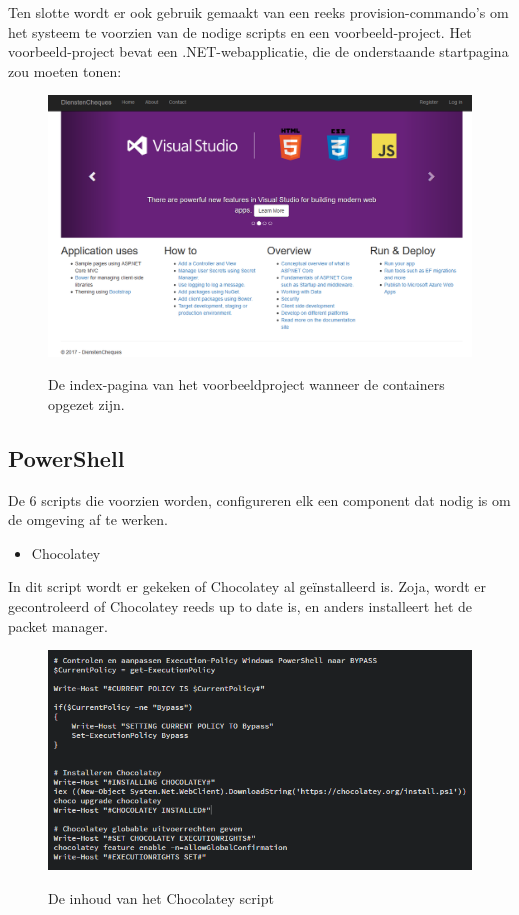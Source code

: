 Ten slotte wordt er ook gebruik gemaakt van een reeks provision-commando's om het systeem te voorzien van de nodige scripts en een voorbeeld-project. Het voorbeeld-project bevat een .NET-webapplicatie, die de onderstaande startpagina zou moeten tonen:

\begin{figure}
	\centering
	\caption{De index-pagina van het voorbeeldproject wanneer de containers opgezet zijn.}
	\includegraphics[scale=0.5]{img/applicatie}
	\label{webapplicatie}
\end{figure}

\subsection{PowerShell}
De 6 scripts die voorzien worden, configureren elk een component dat nodig is om de omgeving af te werken.

\begin{itemize}[noitemsep]
	\item Chocolatey
\end{itemize}

In dit script wordt er gekeken of Chocolatey al geïnstalleerd is. Zoja, wordt er gecontroleerd of Chocolatey reeds up to date is, en anders installeert het de packet manager.

\begin{figure}
	\centering
	\caption{De inhoud van het Chocolatey script}
	\includegraphics[scale=0.6]{img/chocolatey}
	\label{chocolatey}
\end{figure}

